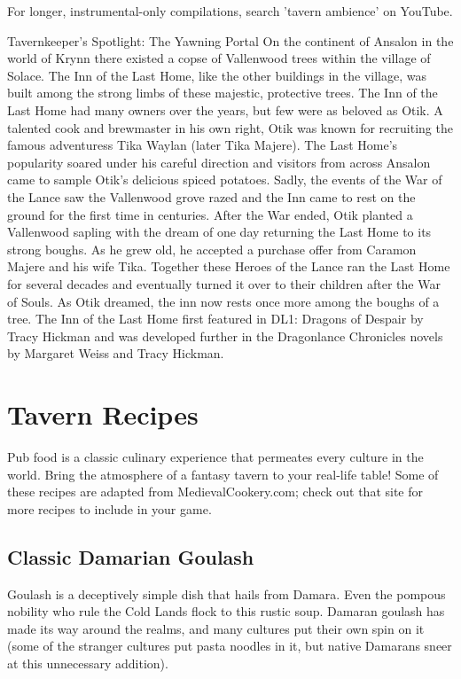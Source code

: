 \documentclass[10pt,a4paper,twoside,twocolumn,openany,bg=print,nodeprecatedcode]{dndbook}
\begin{document}
For longer, instrumental-only compilations, search 'tavern ambience' on YouTube.
\begin{DndComment}{Tavernkeeper's Spotlight: The Yawning Portal}
On the continent of Ansalon in the world of Krynn there existed a copse of Vallenwood trees within the village of Solace. The Inn of the Last Home, like the other buildings in the village, was built among the strong limbs of these majestic, protective trees.
The Inn of the Last Home had many owners over the years, but few were as beloved as Otik. A talented cook and brewmaster in his own right, Otik was known for recruiting the famous adventuress Tika Waylan (later Tika Majere). The Last Home's popularity soared under his careful direction and visitors from across Ansalon came to sample Otik's delicious spiced potatoes. Sadly, the events of the War of the Lance saw the Vallenwood grove razed and the Inn came to rest on the ground for the first time in centuries.
After the War ended, Otik planted a Vallenwood sapling with the dream of one day returning the Last Home to its strong boughs. As he grew old, he accepted a purchase offer from Caramon Majere and his wife Tika. Together these Heroes of the Lance ran the Last Home for several decades and eventually turned it over to their children after the War of Souls. As Otik dreamed, the inn now rests once more among the boughs of a tree.
The Inn of the Last Home first featured in DL1: Dragons of Despair by Tracy Hickman and was developed further in the Dragonlance Chronicles novels by Margaret Weiss and Tracy Hickman.
\end{DndComment}

\section{Tavern Recipes}
Pub food is a classic culinary experience that permeates every culture in the world. Bring the atmosphere of a fantasy tavern to your real-life table! Some of these recipes are adapted from MedievalCookery.com; check out that site for more recipes to include in your game.
\subsection{Classic Damarian Goulash}
Goulash is a deceptively simple dish that hails from Damara. Even the pompous nobility who rule the Cold Lands flock to this rustic soup. Damaran goulash has made its way around the realms, and many cultures put their own spin on it (some of the stranger cultures put pasta noodles in it, but native Damarans sneer at this unnecessary addition).
\end{document}
